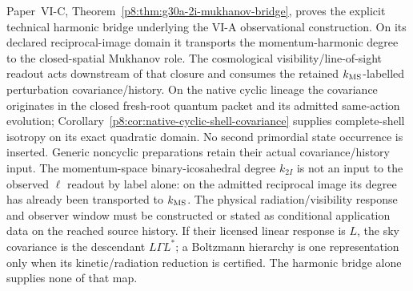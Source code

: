 \documentclass[12pt,a4paper]{article}
\begin{document}
\begin{proposition}
\label{p9:prop:v191-kms-to-sky-interface}
Paper~VI-C, Theorem~\ref{p8:thm:g30a-2i-mukhanov-bridge}, proves the
explicit technical harmonic bridge underlying the VI-A observational
construction. On its declared reciprocal-image domain it transports the
momentum-harmonic degree to the closed-spatial Mukhanov role.
The cosmological visibility/line-of-sight readout acts downstream of that
closure and consumes the retained \(k_{\rm MS}\)-labelled perturbation
covariance/history.  On the native cyclic lineage the covariance originates
in the closed fresh-root quantum packet and its admitted same-action
evolution; Corollary~\ref{p8:cor:native-cyclic-shell-covariance} supplies
complete-shell isotropy on its exact quadratic domain.  No second primordial
state occurrence is inserted.  Generic noncyclic preparations retain their
actual covariance/history input.  The momentum-space
binary-icosahedral degree $k_{2I}$ is not an input to the observed $\ell$
readout by label alone: on the admitted reciprocal image its degree has
already been transported to $k_{\rm MS}$.  The physical radiation/visibility
response and observer window must be constructed or stated as conditional
application data on the reached source history.  If their licensed linear
response is $L$, the sky covariance is the descendant $L\Gamma L^*$;
a Boltzmann hierarchy is one representation only when its kinetic/radiation
reduction is certified.  The harmonic bridge alone supplies none of that map.
\end{proposition}
\end{document}
